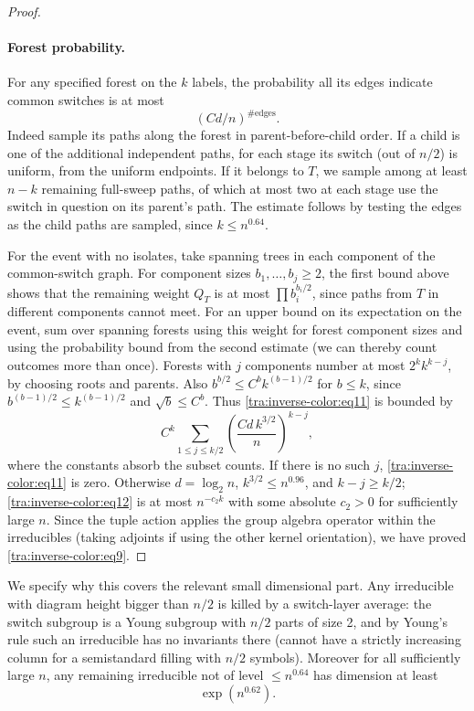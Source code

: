 \begin{proof}
\paragraph{Forest probability.} For any specified forest on the \(k\) labels, the probability all its edges indicate common switches is at most
\[
                                    (C d/n)^{\#\text{edges}} .
\]
Indeed sample its paths along the forest in parent-before-child order. If a child is one of the additional independent paths, for each stage its switch (out of \(n/2\)) is uniform, from the uniform endpoints. If it belongs to \(T\), we sample among at least \(n-k\) remaining full-sweep paths, of which at most two at each stage use the switch in question on its parent's path. The estimate follows by testing the edges as the child paths are sampled, since \(k\le n^{0.64}\).

For the event with no isolates, take spanning trees in each component of the common-switch graph. For component sizes \(b_1,\ldots,b_j\ge2\), the first bound above shows that the remaining weight \(Q_T\) is at most \(\prod b_i^{b_i/2}\), since paths from \(T\) in different components cannot meet. For an upper bound on its expectation on the event, sum over spanning forests using this weight for forest component sizes and using the probability bound from the second estimate (we can thereby count outcomes more than once). Forests with \(j\) components number at most \(2^k k^{k-j}\), by choosing roots and parents. Also \(b^{b/2}\le C^b k^{(b-1)/2}\) for \(b\le k\), since \(b^{(b-1)/2}\le k^{(b-1)/2}\) and \(\sqrt b\le C^b\). Thus \eqref{tra:inverse-color:eq11} is bounded by
\begin{equation}
                      C^k
              \sum_{1\le j\le k/2}
                    \left(\frac{C d\, k^{3/2}}{n}\right)^{k-j},               \label{tra:inverse-color:eq12}
\end{equation}
where the constants absorb the subset counts. If there is no such \(j\), \eqref{tra:inverse-color:eq11} is zero. Otherwise \(d=\log_2 n\), \(k^{3/2}\le n^{0.96}\), and \(k-j\ge k/2\); \eqref{tra:inverse-color:eq12} is at most \(n^{-c_2 k}\) with some absolute \(c_2>0\) for sufficiently large \(n\). Since the tuple action applies the group algebra operator within the irreducibles (taking adjoints if using the other kernel orientation), we have proved \eqref{tra:inverse-color:eq9}.
\end{proof}
\begin{lemma}\label{tra:inverse-color:dimension}
\label{tra:inverse-color:dimension-statement}
We specify why this covers the relevant small dimensional part. Any irreducible with diagram height bigger than \(n/2\) is killed by a switch-layer average: the switch subgroup is a Young subgroup with \(n/2\) parts of size 2, and by Young's rule such an irreducible has no invariants there (cannot have a strictly increasing column for a semistandard filling with \(n/2\) symbols). Moreover for all sufficiently large \(n\), any remaining irreducible not of level \(\le n^{0.64}\) has dimension at least
\[
                                 \exp(n^{0.62}).
\]
\end{lemma}
